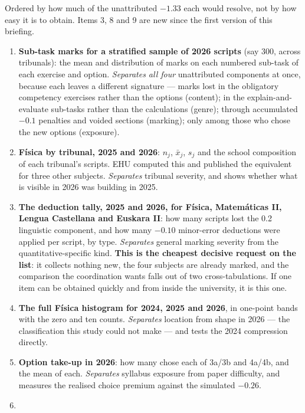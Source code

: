 \documentclass[
  10.5pt,
  a4paper,
  DIV=11,
  numbers=noendperiod]{scrartcl}
\providecommand{\tightlist}{%
  \setlength{\itemsep}{0pt}\setlength{\parskip}{0pt}}
\begin{document}
Ordered by how much of the unattributed \(-1.33\) each would resolve,
not by how easy it is to obtain. Items 3, 8 and 9 are new since the
first version of this briefing.

\begin{enumerate}
\def\labelenumi{\arabic{enumi}.}
\tightlist
\item
  \textbf{Sub-task marks for a stratified sample of 2026 scripts} (say
  300, across tribunals): the mean and distribution of marks on each
  numbered sub-task of each exercise and option. \emph{Separates all
  four} unattributed components at once, because each leaves a different
  signature --- marks lost in the obligatory competency exercises rather
  than the options (content); in the explain-and-evaluate sub-tasks
  rather than the calculations (genre); through accumulated \(-0.1\)
  penalties and voided sections (marking); only among those who chose
  the new options (exposure).
\item
  \textbf{Física by tribunal, 2025 and 2026}: \(n_j\), \(\bar{x}_j\),
  \(s_j\) and the school composition of each tribunal's scripts. EHU
  computed this and published the equivalent for three other subjects.
  \emph{Separates} tribunal severity, and shows whether what is visible
  in 2026 was building in 2025.
\item
  \textbf{The deduction tally, 2025 and 2026, for Física, Matemáticas
  II, Lengua Castellana and Euskara II}: how many scripts lost the 0.2
  linguistic component, and how many \(-0.10\) minor-error deductions
  were applied per script, by type. \emph{Separates} general marking
  severity from the quantitative-specific kind. \textbf{This is the
  cheapest decisive request on the list}: it collects nothing new, the
  four subjects are already marked, and the comparison the coordination
  wants falls out of two cross-tabulations. If one item can be obtained
  quickly and from inside the university, it is this one.
\item
  \textbf{The full Física histogram for 2024, 2025 and 2026}, in
  one-point bands with the zero and ten counts. \emph{Separates}
  location from shape in 2026 --- the classification this study could
  not make --- and tests the 2024 compression directly.
\item
  \textbf{Option take-up in 2026}: how many chose each of 3a/3b and
  4a/4b, and the mean of each. \emph{Separates} syllabus exposure from
  paper difficulty, and measures the realised choice premium against the
  simulated \(-0.26\).
\item

\end{enumerate}
\end{document}
